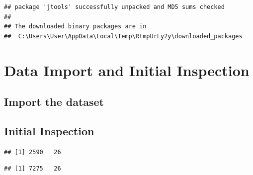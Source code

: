 \documentclass[
]{article}
\begin{document}
\begin{verbatim}
## package 'jtools' successfully unpacked and MD5 sums checked
## 
## The downloaded binary packages are in
##  C:\Users\User\AppData\Local\Temp\RtmpUrLy2y\downloaded_packages
\end{verbatim}

\section{Data Import and Initial
Inspection}\label{data-import-and-initial-inspection}

\subsection{Import the dataset}\label{import-the-dataset}

\subsection{Initial Inspection}\label{initial-inspection}

\begin{verbatim}
## [1] 2590   26
\end{verbatim}

\begin{verbatim}
## [1] 7275   26
\end{verbatim}
\end{document}
